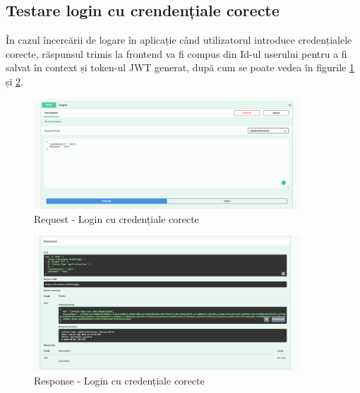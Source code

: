 \subsection{Testare login cu crendențiale corecte}
În cazul încercării de logare în aplicație când utilizatorul introduce credențialele corecte, răspunsul trimis la frontend va fi compus din Id-ul userului pentru a fi salvat în context și token-ul JWT generat, după cum se poate vedea în figurile \ref{fig:login1} și \ref{fig:login2}.

\begin{figure}[H]
	\centering
	\includegraphics[width=100mm, scale=2]{figs/login1.png}
    \caption{Request - Login cu credențiale corecte}
	\label{fig:login1}
\end{figure}

\begin{figure}[H]
	\centering
	\includegraphics[width=100mm, scale=2]{figs/login2.png}
    \caption{Response - Login cu credențiale corecte}
	\label{fig:login2}
\end{figure}
